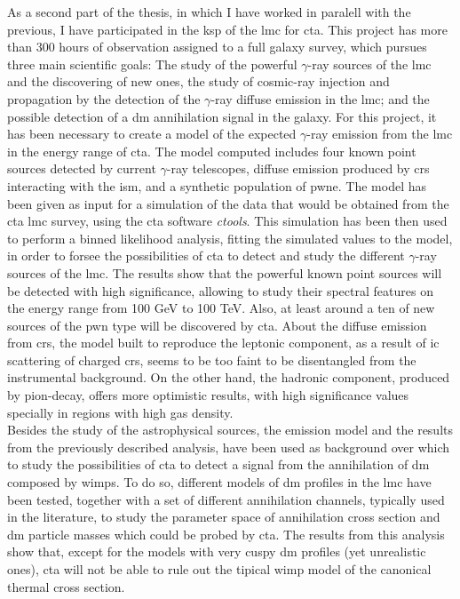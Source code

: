 \documentclass[main.tex]{subfiles}
\begin{document}
As a second part of the thesis, in which I have worked in paralell with the previous, I have participated in the \gls{ksp} of the \gls{lmc} for \gls{cta}. This project has more than 300 hours of observation assigned to a full galaxy survey, which pursues three main scientific goals: The study of the powerful $\gamma$-ray sources of the \gls{lmc} and the discovering of new ones, the study of cosmic-ray injection and propagation by the detection of the $\gamma$-ray diffuse emission in the \gls{lmc}; and the possible detection of a \gls{dm} annihilation signal in the galaxy. For this project, it has been necessary to create a model of the expected $\gamma$-ray emission from the \gls{lmc} in the energy range of \gls{cta}. The model computed includes four known point sources detected by current $\gamma$-ray telescopes, diffuse emission produced by \glspl{cr} interacting with the \gls{ism}, and a synthetic population of \gls{pwne}. The model has been given as input for a simulation of the data that would be obtained from the \gls{cta} \gls{lmc} survey, using the \gls{cta} software \textit{ctools}. This simulation has been then used to perform a binned likelihood analysis, fitting the simulated values to the model, in order to forsee the possibilities of \gls{cta} to detect and study the different $\gamma$-ray sources of the \gls{lmc}. The results show that the powerful known point sources will be detected with high significance, allowing to study their spectral features on the energy range from 100 GeV to 100 TeV. Also, at least around a ten of new sources of the \gls{pwn} type will be discovered by \gls{cta}. About the diffuse emission from \glspl{cr}, the model built to reproduce the leptonic component, as a result of \gls{ic} scattering of charged \glspl{cr}, seems to be too faint to be disentangled from the instrumental background. On the other hand, the hadronic component, produced by pion-decay, offers more optimistic results, with high significance values specially in regions with high gas density.\\
Besides the study of the astrophysical sources, the emission model and the results from the previously described analysis, have been used as background over which to study the possibilities of \gls{cta} to detect a signal from the annihilation of \gls{dm} composed by \glspl{wimp}. To do so, different models of \gls{dm} profiles in the \gls{lmc} have been tested, together with a set of different annihilation channels, typically used in the literature, to study the parameter space of annihilation cross section and \gls{dm} particle masses which could be probed by \gls{cta}. The results from this analysis show that, except for the models with very cuspy \gls{dm} profiles (yet unrealistic ones), \gls{cta} will not be able to rule out the tipical \gls{wimp} model of the canonical thermal cross section.\\
\end{document}
